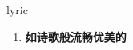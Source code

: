 
\begin{frame}
{\huge lyric}
\begin{center}
\begin{enumerate}\Large
  \item \textbf{如诗歌般流畅优美的}
\end{enumerate}
\end{center}
\end{frame}
